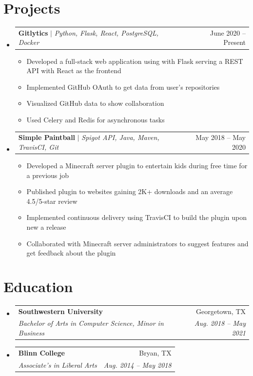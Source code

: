\documentclass[letterpaper,11pt]{article}
\makeatletter
\newcommand{\resumeItem}[1]{
  \item\small{
    {#1 \vspace{-2pt}}
  }
}
\newcommand{\resumeSubheading}[4]{
  \vspace{-2pt}\item
    \begin{tabular*}{0.97\textwidth}[t]{l@{\extracolsep{\fill}}r}
      \textbf{#1} & #2 \\
      \textit{\small#3} & \textit{\small #4} \\
    \end{tabular*}\vspace{-7pt}
}
\newcommand{\resumeProjectHeading}[2]{
    \item
    \begin{tabular*}{0.97\textwidth}{l@{\extracolsep{\fill}}r}
      \small#1 & #2 \\
    \end{tabular*}\vspace{-7pt}
}
\newcommand{\resumeSubHeadingListStart}{\begin{itemize}[leftmargin=0.15in, label={}]}
\newcommand{\resumeSubHeadingListEnd}{\end{itemize}}
\newcommand{\resumeItemListStart}{\begin{itemize}}
\newcommand{\resumeItemListEnd}{\end{itemize}\vspace{-5pt}}
\makeatother
\begin{document}
\section{Projects}
    \resumeSubHeadingListStart
      \resumeProjectHeading
          {\textbf{Gitlytics} $|$ \emph{Python, Flask, React, PostgreSQL, Docker}}{June 2020 -- Present}
          \resumeItemListStart
            \resumeItem{Developed a full-stack web application using with Flask serving a REST API with React as the frontend}
            \resumeItem{Implemented GitHub OAuth to get data from user’s repositories}
            \resumeItem{Visualized GitHub data to show collaboration}
            \resumeItem{Used Celery and Redis for asynchronous tasks}
          \resumeItemListEnd
      \resumeProjectHeading
          {\textbf{Simple Paintball} $|$ \emph{Spigot API, Java, Maven, TravisCI, Git}}{May 2018 -- May 2020}
          \resumeItemListStart
            \resumeItem{Developed a Minecraft server plugin to entertain kids during free time for a previous job}
            \resumeItem{Published plugin to websites gaining 2K+ downloads and an average 4.5/5-star review}
            \resumeItem{Implemented continuous delivery using TravisCI to build the plugin upon new a release}
            \resumeItem{Collaborated with Minecraft server administrators to suggest features and get feedback about the plugin}
          \resumeItemListEnd
    \resumeSubHeadingListEnd



%
\section{Education}
  \resumeSubHeadingListStart
    \resumeSubheading
      {Southwestern University}{Georgetown, TX}
      {Bachelor of Arts in Computer Science, Minor in Business}{Aug. 2018 -- May 2021}
    \resumeSubheading
      {Blinn College}{Bryan, TX}
      {Associate's in Liberal Arts}{Aug. 2014 -- May 2018}
  \resumeSubHeadingListEnd


\end{document}
